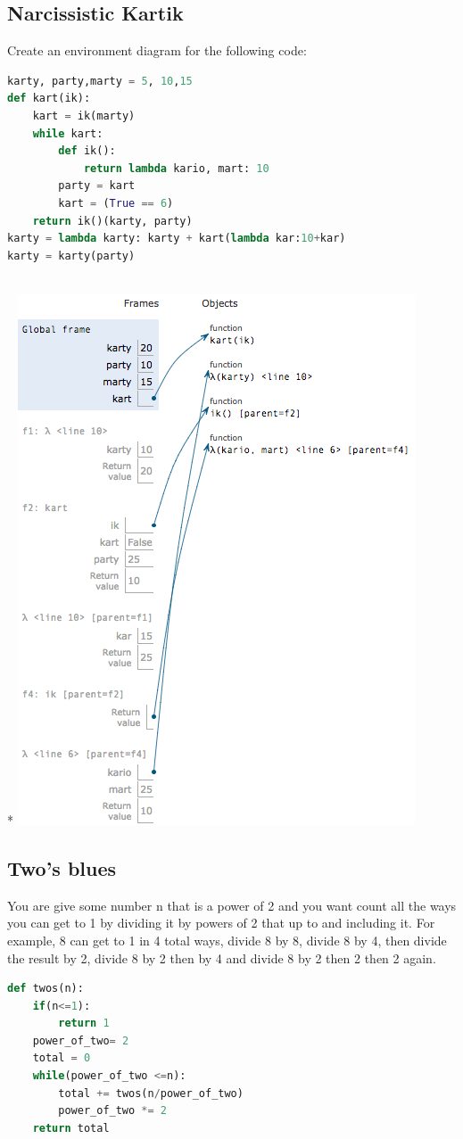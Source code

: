 \documentclass{article}
\begin{document}
\subsection{Narcissistic Kartik}
\begin{subq}
\subqs Create an environment diagram for the following code:
\begin{lstlisting}[language = Python]
karty, party,marty = 5, 10,15
def kart(ik):
    kart = ik(marty)
    while kart:
        def ik():
            return lambda kario, mart: 10
        party = kart
        kart = (True == 6)
    return ik()(karty, party)
karty = lambda karty: karty + kart(lambda kar:10+kar)
karty = karty(party)
\end{lstlisting}
\begin{solution}
\\* \includegraphics[scale=.5]{../images/kartik.png}
\end{solution}
\end{subq}
\subsection{Two's blues}
You are give some number n that is  a power of 2 and you want count all the ways you can get to 1 by dividing it by powers of 2 that up to and including it. For example, 8 can get to 1 in 4 total ways, divide 8 by 8, divide 8 by 4, then divide the result by 2, divide 8 by 2 then by 4 and divide 8 by 2 then 2 then 2 again.
\begin{solution}
\begin{lstlisting}[language = Python]
def twos(n):
    if(n<=1):
        return 1
    power_of_two= 2
    total = 0
    while(power_of_two <=n):
        total += twos(n/power_of_two)
        power_of_two *= 2
    return total
\end{lstlisting}
\end{solution}

\newpage
\end{document}
